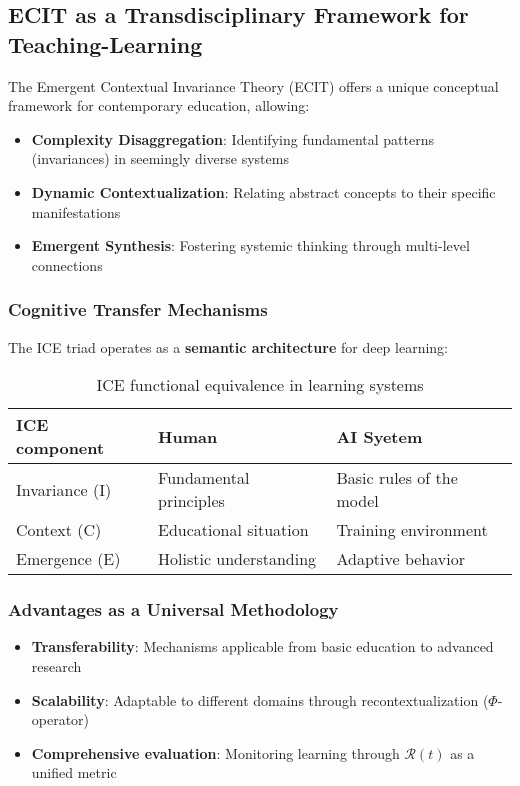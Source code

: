 \documentclass{article}
\begin{document}
\subsection{ECIT as a Transdisciplinary Framework for Teaching-Learning}
The Emergent Contextual Invariance Theory (ECIT) offers a unique conceptual framework for contemporary education, allowing:

\begin{itemize}
    \item \textbf{Complexity Disaggregation}: Identifying fundamental patterns (invariances) in seemingly diverse systems
    \item \textbf{Dynamic Contextualization}: Relating abstract concepts to their specific manifestations
    \item \textbf{Emergent Synthesis}: Fostering systemic thinking through multi-level connections
\end{itemize}

\subsubsection{Cognitive Transfer Mechanisms}
The ICE triad operates as a \textbf{semantic architecture} for deep learning:

\begin{table}[h!]
    \centering
    \begin{tabular}{|l|l|l|}
    \hline
    \textbf{ICE component} & \textbf{Human} & \textbf{AI Syetem} \\ \hline
    Invariance (I) & Fundamental principles & Basic rules of the model \\
    Context (C) & Educational situation & Training environment \\
    Emergence (E) & Holistic understanding & Adaptive behavior \\ \hline
    \end{tabular}
    \caption{ICE functional equivalence in learning systems}
\end{table}


\subsubsection{Advantages as a Universal Methodology}
\begin{itemize}
    \item \textbf{Transferability}: Mechanisms applicable from basic education to advanced research
    \item \textbf{Scalability}: Adaptable to different domains through recontextualization ($\Phi$-operator)
    \item \textbf{Comprehensive evaluation}: Monitoring learning through $\mathcal{R}(t)$ as a unified metric
\end{itemize}
\end{document}
